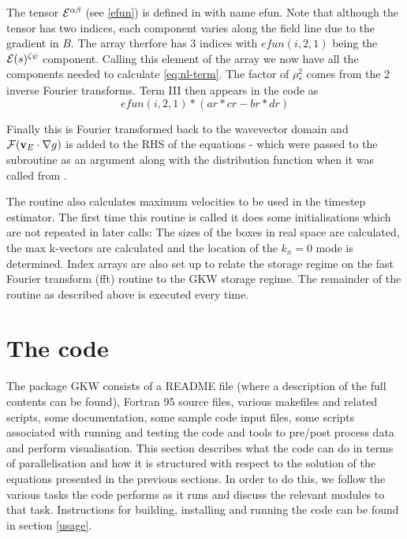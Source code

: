 The tensor ${\cal E}^{\alpha \beta}$ (see \ref{efun}) is defined in  with name  {\name efun}. Note that although the tensor has two indices, each component varies along the field line due to the gradient in $B$. The array therfore has 3 indices with $efun{(i,2,1)}$ being the ${\cal E}(s)^{\zeta \psi}$ component. Calling this element of the array we now have all the components needed to calculate \ref{eq:nl-term}.  The factor of $\rho_*^2$ comes from the 2 inverse Fourier transforms.  Term III then appears in the code as
\begin{equation}
efun(i,2,1)*({ar*cr-br*dr})
\end{equation}

Finally this is Fourier transformed back to the wavevector domain and $\mathcal{F}({\bf v}_E \cdot \nabla g)$ is added to the RHS of the equations -  which were passed to the subroutine as an argument along with the distribution function when it was called from .

\par
The routine also calculates maximum velocities to be used in the timestep estimator.  The first time this routine is called it does some initialisations which are not repeated in later calls:  The sizes of the boxes in real space are calculated, the max k-vectors are calculated and the location of the $k_x = 0$ mode is determined.  Index arrays are also set up to relate the storage regime on the fast Fourier transform (fft) routine to the GKW storage regime. The remainder of the routine as described above is executed every time.

\section{The code}\label{thecode}

The package GKW consists of a README file (where a description of the full contents can be found),
Fortran 95 source files, various makefiles and related scripts, some documentation, some sample code input files,
some scripts associated with running and testing the code and tools to pre/post process data and perform visualisation.
This section describes what the code can do in terms of parallelisation and how it is structured
with respect to the solution of the equations presented in the previous sections. In order to do
this, we follow the various tasks the code performs as it runs and discuss the relevant modules to
that task. Instructions for building, installing and running the code can be found in section \ref{usage}.

